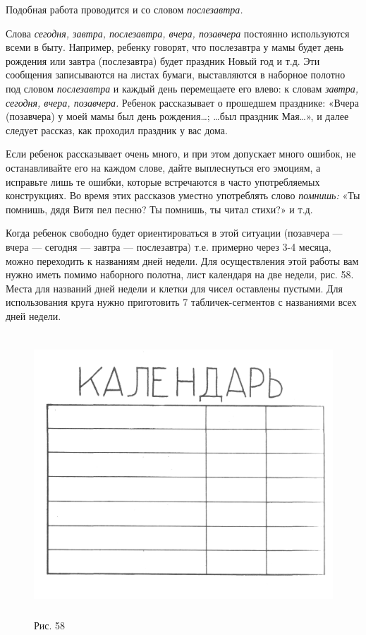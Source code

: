 \documentclass[a5paper]{book}
\renewcommand{\emph}[1]{\textit{#1}}
\begin{document}
Подобная работа проводится и со словом \emph{послезавтра.}

Слова \emph{сегодня, завтра, послезавтра, вчера, позавчера} постоянно
используются всеми в быту. Например, ребенку говорят, что послезавтра у
мамы будет день рождения или завтра (послезавтра) будет праздник Новый
год и т.д. Эти сообщения записываются на листах бумаги, выставляются в
наборное полотно под словом \emph{послезавтра} и каждый день перемещаете
его влево: к словам \emph{завтра, сегодня, вчера, позавчера.} Ребенок
рассказывает о прошедшем празднике: «Вчера (позавчера) у моей мамы был
день рождения\ldots; \ldots был праздник Мая\ldots», и далее следует
рассказ, как проходил праздник у вас дома.

Если ребенок рассказывает очень много, и при этом допускает много
ошибок, не останавливайте его на каждом слове, дайте выплеснуться его
эмоциям, а исправьте лишь те ошибки, которые встречаются в часто
употребляемых конструкциях. Во время этих рассказов уместно употреблять
слово \emph{помнишь:} «Ты помнишь, дядя Витя пел песню? Ты помнишь, ты
читал стихи?» и т.д.

Когда ребенок свободно будет ориентироваться в этой ситуации (позавчера
--- вчера --- сегодня --- завтра --- послезавтра) т.е. примерно через
3-4 месяца, можно переходить к названиям дней недели. Для осуществления
этой работы вам нужно иметь помимо наборного полотна, лист календаря на
две недели, рис. 58. Места для названий дней недели и клетки для чисел
оставлены пустыми. Для использования круга нужно приготовить 7
табличек-сегментов с названиями всех дней недели.

\begin{figure}
\centering
\includegraphics[width=5.01319in,height=4.16667in]{media/media/image55.jpg}
\caption*{Рис. 58}
\end{figure}
\end{document}
